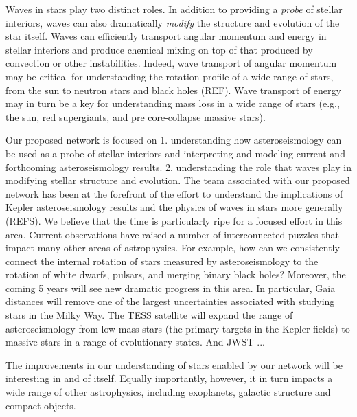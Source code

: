 Waves in stars play two distinct roles.  In addition to providing a {\em probe} of stellar interiors, waves can also dramatically {\em modify} the structure and evolution of the star itself.   Waves can efficiently transport angular momentum and energy in stellar interiors and produce chemical mixing on top of that produced by convection or other instabilities.   Indeed, wave transport of angular momentum may be critical for understanding the rotation profile of a wide range of stars, from the sun to neutron stars and black holes (REF).   Wave transport of energy may in turn be a key for understanding mass loss in a wide range of stars (e.g., the sun, red supergiants, and pre core-collapse massive stars).   

Our proposed network is focused on 1.  understanding how asteroseismology can be used as a probe of stellar interiors and interpreting and modeling current and forthcoming asteroseismology results.  2.  understanding the role that waves play in modifying stellar structure and evolution.  The team associated with our proposed network has been at the forefront of the effort to understand the implications of Kepler asteroseismology results and the physics of waves in stars more generally (REFS).  We believe that the time is particularly ripe for a focused effort in this area.  Current observations have raised a number of interconnected puzzles that impact many other areas of astrophysics.  For example, how can we consistently connect the internal rotation of stars measured by asteroseismology to the rotation of white dwarfs, pulsars, and merging binary black holes?   Moreover, the coming 5 years will see new dramatic progress in this area. In particular, Gaia distances will remove one of the largest uncertainties associated with studying stars in the Milky Way.  The TESS satellite will expand the range of asteroseismology from low mass stars (the primary targets in the Kepler fields) to massive stars in a range of evolutionary states.   And JWST ...   

The improvements in our understanding of stars enabled by our network will be interesting in and of itself.  Equally importantly, however, it in turn impacts a wide range of other astrophysics, including exoplanets, galactic structure and compact objects.   


